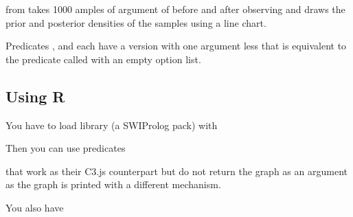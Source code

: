\documentclass[letterpaper,10pt,english]{sphinxmanual}
\begin{document}
\sphinxAtStartPar
from  takes 1000 amples of argument  of  before and after observing  and draws the prior and posterior densities of the samples using a line chart.

\sphinxAtStartPar
Predicates ,  and  each have a version with one argument less that is equivalent to the predicate called with an empty option list.


\subsection{Using R}
\label{\detokenize{index:using-r}}
\sphinxAtStartPar
You have to load library  (a SWI\sphinxhyphen{}Prolog pack) with

\begin{sphinxVerbatim}[commandchars=\\\{\}]
 
\end{sphinxVerbatim}

\sphinxAtStartPar
Then you can use predicates

\begin{sphinxVerbatim}[commandchars=\\\{\}]
\end{sphinxVerbatim}

\sphinxAtStartPar
that work as their C3.js counterpart but do not return the graph as an argument as the graph is printed with a different mechanism.

\sphinxAtStartPar
You also have

\begin{sphinxVerbatim}[commandchars=\\\{\}]
  
\end{sphinxVerbatim}
\end{document}
